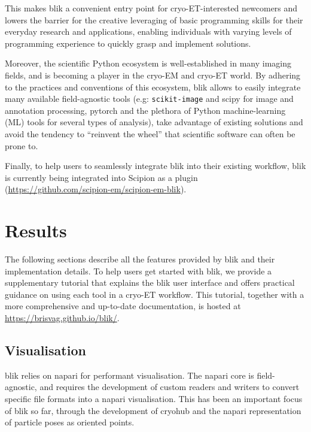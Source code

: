 This makes blik a convenient entry point for cryo-ET-interested newcomers and lowers the barrier for the creative leveraging of basic programming skills for their everyday research and applications, enabling individuals with varying levels of programming experience to quickly grasp and implement solutions.

Moreover, the scientific Python ecosystem is well-established in many imaging fields, and is becoming a player in the cryo-EM and cryo-ET world. By adhering to the practices and conventions of this ecosystem, blik allows to easily integrate many available field-agnostic tools (e.g: \texttt{scikit-image} and scipy for image and annotation processing, pytorch and the plethora of Python machine-learning (ML) tools for several types of analysis), take advantage of existing solutions and avoid the tendency to ``reinvent the wheel'' that scientific software can often be prone to.

\vspace{\baselineskip}

Finally, to help users to seamlessly integrate blik into their existing workflow, blik is currently being integrated into Scipion as a plugin (\url{https://github.com/scipion-em/scipion-em-blik}).

\section{Results}

The following sections describe all the features provided by blik and their implementation details. To help users get started with blik, we provide a supplementary tutorial that explains the blik user interface and offers practical guidance on using each tool in a cryo-ET workflow. This tutorial, together with a more comprehensive and up-to-date documentation, is hosted at \url{https://brisvag.github.io/blik/}.

\subsection{Visualisation}\label{visualisation}

blik relies on napari for performant visualisation. The napari core is field-agnostic, and requires the development of custom readers and writers to convert specific file formats into a napari visualisation. This has been an important focus of blik so far, through the development of cryohub and the napari representation of particle poses as oriented points.

